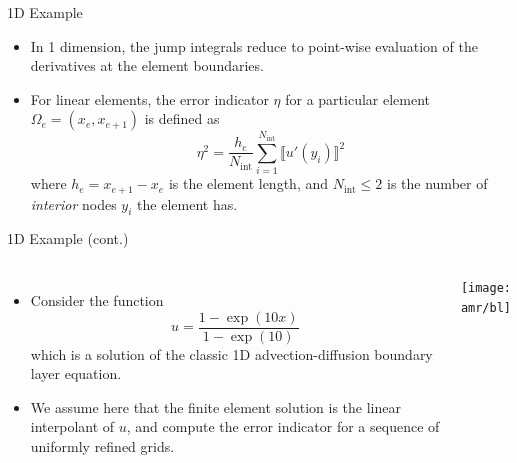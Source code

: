 \begin{frame}{1D Example}
\begin{itemize}
\item In 1 dimension, the jump integrals reduce to point-wise evaluation
  of the derivatives at the element boundaries.

  \item For linear elements, the error indicator $\eta$ for a particular element
    $\Omega_e = (x_e, x_{e+1})$ is defined as
    \begin{equation}
      \eta^2 =
	\frac{h_e}{N_{\text{int}}} \sum_{i=1}^{N_{\text{int}}}  \llbracket u'(y_i) \rrbracket^2
    \end{equation}
    where $h_e = x_{e+1} - x_e$ is the element length, and $N_{\text{int}} \leq 2$ is the number of
    \emph{interior} nodes $y_i$ the element has.

\end{itemize}

\end{frame}



\begin{frame}{1D Example (cont.)}
  \begin{columns}
    \begin{itemize}
    \item Consider the function
      \begin{equation}
        \nonumber
        u = \frac{1-\exp(10x)}{1-\exp(10)}
      \end{equation}
      which is a solution of the classic 1D advection-diffusion boundary layer equation.
\item We assume here that the finite element solution is the linear
  interpolant of $u$, and compute the error indicator for a sequence of
  uniformly refined grids.
\end{itemize}

  \begin{center}
    \texttt{[image: amr/bl]}
  \end{center}
  \end{columns}
\end{frame}



